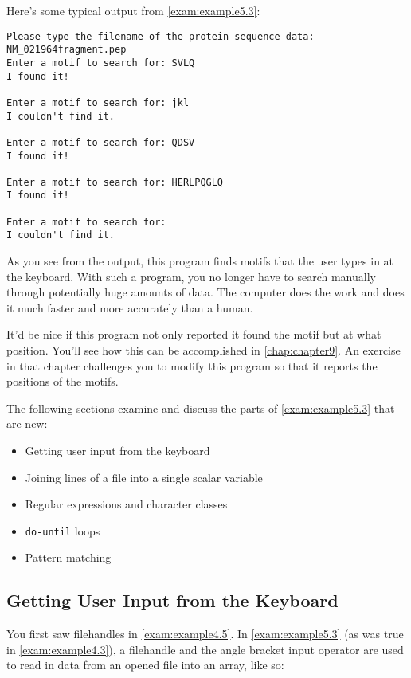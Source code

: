 

Here's some typical output from \autoref{exam:example5.3}:

\begin{lstlisting}
Please type the filename of the protein sequence data:
NM_021964fragment.pep
Enter a motif to search for: SVLQ
I found it!

Enter a motif to search for: jkl
I couldn't find it.

Enter a motif to search for: QDSV
I found it!

Enter a motif to search for: HERLPQGLQ
I found it!

Enter a motif to search for: 
I couldn't find it. 
\end{lstlisting}

As you see from the output, this program finds motifs that the user types in at the keyboard. With such a program, you no longer have to search manually through potentially huge amounts of data. The computer does the work and does it much faster and more accurately than a human.

It'd be nice if this program not only reported it found the motif but at what position. You'll see how this can be accomplished in \autoref{chap:chapter9}. An exercise in that chapter challenges you to modify this program so that it reports the positions of the motifs.

The following sections examine and discuss the parts of \autoref{exam:example5.3} that are new:

\begin{itemize}
  \item Getting user input from the keyboard
  \item Joining lines of a file into a single scalar variable
  \item Regular expressions and character classes
  \item \verb|do-until| loops
  \item Pattern matching
\end{itemize}

\subsection{Getting User Input from the Keyboard}
You first saw filehandles in \autoref{exam:example4.5}. In \autoref{exam:example5.3} (as was true in \autoref{exam:example4.3}), a filehandle and the angle bracket input operator are used to read in data from an opened file into an array, like so:

